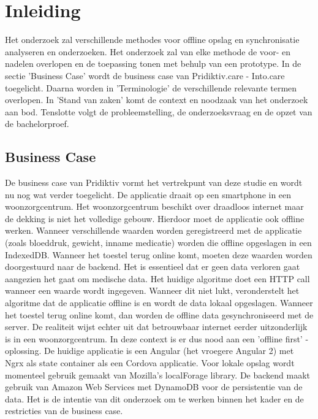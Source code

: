 \chapter{Inleiding}
\label{ch:inleiding}
Het onderzoek zal verschillende methodes voor offline opslag en synchronisatie analyseren en onderzoeken. Het onderzoek zal van elke methode de voor- en nadelen overlopen en de toepassing tonen met behulp van een prototype. In de sectie 'Business Case' wordt de business case van Pridiktiv.care - Into.care toegelicht. Daarna worden in 'Terminologie' de verschillende relevante termen overlopen. In 'Stand van zaken' komt de context en noodzaak van het onderzoek aan bod. Tenslotte volgt de probleemstelling, de onderzoeksvraag en de opzet van de bachelorproef.
\section{Business Case}
\label{sec:business-case}
De business case van Pridiktiv vormt het vertrekpunt van deze studie en wordt nu nog wat verder toegelicht. De applicatie draait op een smartphone in een woonzorgcentrum. Het woonzorgcentrum beschikt over draadloos internet maar de dekking is niet het volledige gebouw. Hierdoor moet de applicatie ook offline werken. Wanneer verschillende waarden worden geregistreerd met de applicatie (zoals bloeddruk, gewicht, inname medicatie) worden die offline opgeslagen in een IndexedDB. Wanneer het toestel terug online komt, moeten deze waarden worden doorgestuurd naar de backend. Het is essentieel dat er geen data verloren gaat aangezien het gaat om medische data. Het huidige algoritme doet een HTTP call wanneer een waarde wordt ingegeven. Wanneer dit niet lukt, veronderstelt het algoritme dat de applicatie offline is en wordt de data lokaal opgeslagen. Wanneer het toestel terug online komt, dan worden de offline data gesynchroniseerd met de server. De realiteit wijst echter uit dat betrouwbaar internet eerder uitzonderlijk is in een woonzorgcentrum. In deze context is er dus nood aan een 'offline first' -  oplossing. De huidige applicatie is een Angular (het vroegere Angular 2) met Ngrx als state container als een Cordova applicatie. Voor lokale opslag wordt momenteel gebruik gemaakt van Mozilla's localForage library. De backend maakt gebruik van Amazon Web Services met DynamoDB voor de persistentie van de data. Het is de intentie van dit onderzoek om te werken binnen het kader en de restricties van de business case.
